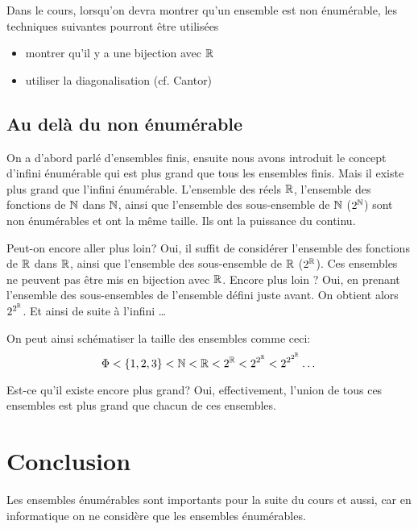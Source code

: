 Dans le cours, lorsqu'on devra montrer qu'un ensemble est non énumérable,
les techniques suivantes pourront être utilisées
\begin{itemize}
	\item montrer qu'il y a une bijection avec  $\mathbb{R}$
	\item utiliser la diagonalisation (cf. Cantor)
\end{itemize}


\subsection{Au delà du non énumérable}
\label{subsec:au_dela_du_non_enumerable}
On a d'abord parlé d'ensembles finis, ensuite nous avons introduit le concept d'infini 
énumérable qui est plus grand que tous les ensembles finis. Mais il existe plus grand 
que l'infini énumérable.   L'ensemble des réels $\mathbb{R}$, l'ensemble des fonctions de $\mathbb{N}$ dans $\mathbb{N}$, ainsi que 
l'ensemble des sous-ensemble de $\mathbb{N}$ ($2^{\mathbb{N}}$) sont non énumérables et ont la même taille.  Ils ont la puissance du continu. 

Peut-on encore aller plus loin?  Oui,  il suffit de considérer  l'ensemble des fonctions de $\mathbb{R}$ dans $\mathbb{R}$, ainsi que 
l'ensemble des sous-ensemble de $\mathbb{R}$ ($2^{\mathbb{R}}$).  Ces ensembles ne peuvent pas être mis en bijection avec $\mathbb{R}$.
Encore plus loin ?  Oui, en prenant l'ensemble des sous-ensembles de l'ensemble défini juste avant.  On obtient alors $2^{2^{\mathbb{R}}}$.  Et ainsi de suite à l'infini \ldots

On peut ainsi schématiser la taille des ensembles comme ceci:
$$\Phi < \{1,2,3\} < \mathbb{N} < \mathbb{R} < 2^{\mathbb{R}} < 2^{2^{\mathbb{R}}} < 2^{2^{2^{\mathbb{R}}}} \dots$$

Est-ce qu'il existe encore plus grand? Oui, effectivement, l'union de tous ces ensembles 
est plus grand que chacun de ces ensembles.


\section{Conclusion}

Les ensembles énumérables sont importants pour la suite du cours et aussi, car en
informatique on ne considère que les ensembles énumérables.




